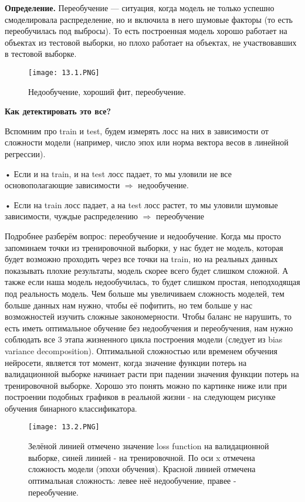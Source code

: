 \textbf{Определение.} Переобучение — ситуация, когда модель не только успешно смоделировала распределение, но и включила в него шумовые факторы (то есть переобучилась под выбросы). То есть построенная модель хорошо работает на объектах из тестовой выборки, но плохо работает на объектах, не участвовавших в тестовой выборке.

\begin{figure}[h]
\centering
\texttt{[image: 13.1.PNG]}
\caption{Недообучение, хороший фит, переобучение.}
\end{figure}

\textbf{Как детектировать это все?}

Вспомним про train и test, будем измерять лосс на них в зависимости от сложности модели (например,
число эпох или норма вектора весов в линейной регрессии).

• Если и на train, и на test лосс падает, то мы уловили не все основополагающие зависимости
$\Longrightarrow$ недообучение.

• Если на train лосс падает, а на test лосс растет, то мы уловили шумовые зависимости, чуждые
распределению $\Longrightarrow$ переобучение

Подробнее разберём вопрос: переобучение и недообучение. Когда мы просто запоминаем точки из тренировочной выборки, у нас будет не модель, которая будет возможно проходить через все точки на train, но на реальных данных показывать плохие результаты, модель скорее всего будет слишком сложной. А также если наша модель недообучилась, то будет слишком простая, неподходящая под реальность модель. Чем больше мы увеличиваем сложность моделей, тем больше данных нам нужно, чтобы её пофитить, но тем больше у нас возможностей изучить сложные закономерности. Чтобы баланс не нарушить, то есть иметь оптимальное обучение без недообучения и переобучения, нам нужно соблюдать все 3 этапа жизненного цикла построения модели (следует из bias variance decomposition). Оптимальной сложностью или временем обучения нейросети, является тот момент, когда значение функции потерь на валидационной выборке начинает расти при падении значения функции потерь на тренировочной выборке. Хорошо это понять можно по картинке ниже или при построении подобных графиков в реальной жизни - на следующем рисунке обучения бинарного классификатора. 


\begin{figure}[h]
\centering
\texttt{[image: 13.2.PNG]}
\caption{Зелёной линией отмечено значение loss function на валидационной выборке, синей линией - на тренировочной. По оси x отмечена сложность модели (эпохи обучения). Красной линией отмечена оптимальная сложность: левее неё недообучение, правее - переобучение.}
\end{figure}

